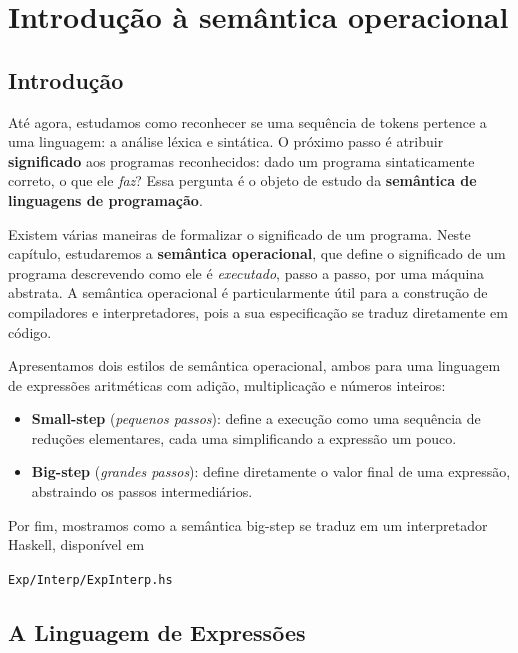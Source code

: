 \chapter{Introdução à semântica operacional}

\section{Introdução}

Até agora, estudamos como reconhecer se uma sequência de tokens
pertence a uma linguagem: a análise léxica e sintática. O próximo
passo é atribuir \textbf{significado} aos programas reconhecidos:
dado um programa sintaticamente correto, o que ele \emph{faz}? Essa
pergunta é o objeto de estudo da \textbf{semântica de linguagens de
programação}.

Existem várias maneiras de formalizar o significado de um programa.
Neste capítulo, estudaremos a \textbf{semântica operacional}, que
define o significado de um programa descrevendo como ele é
\emph{executado}, passo a passo, por uma máquina abstrata. A
semântica operacional é particularmente útil para a construção de
compiladores e interpretadores, pois a sua especificação se traduz
diretamente em código.

Apresentamos dois estilos de semântica operacional, ambos para uma
linguagem de expressões aritméticas com adição, multiplicação e
números inteiros:

\begin{itemize}
  \item
    \textbf{Small-step} (\emph{pequenos passos}): define a execução
    como uma sequência de reduções elementares, cada uma
    simplificando a expressão um pouco.
  \item
    \textbf{Big-step} (\emph{grandes passos}): define diretamente o
    valor final de uma expressão, abstraindo os passos intermediários.
\end{itemize}

Por fim, mostramos como a semântica big-step se traduz em um
interpretador Haskell, disponível em

\begin{flushleft}
  \verb|Exp/Interp/ExpInterp.hs|
\end{flushleft}

\section{A Linguagem de Expressões}

